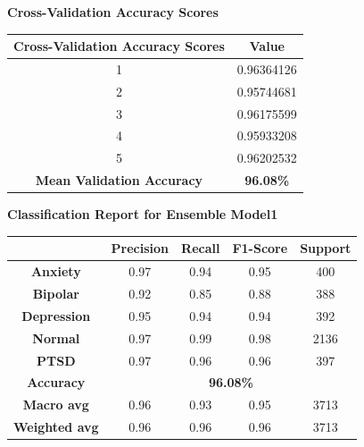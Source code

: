 \begin{center}
    \textbf{Cross-Validation Accuracy Scores} \\[0.5em]
    \begin{tabular}{|c|c|}
        \hline
        \textbf{Cross-Validation Accuracy Scores} & \textbf{Value} \\ \hline
        1 & 0.96364126 \\ \hline
        2 & 0.95744681 \\ \hline
        3 & 0.96175599 \\ \hline
        4 & 0.95933208 \\ \hline
        5 & 0.96202532 \\ \hline
        \textbf{Mean Validation Accuracy} & \textbf{96.08\%} \\ \hline
    \end{tabular}
\end{center}


\begin{center}
    \textbf{Classification Report for Ensemble Model1} \\[0.5em]
    \begin{tabular}{|c|c|c|c|c|}
        \hline
        & \textbf{Precision} & \textbf{Recall} & \textbf{F1-Score} & \textbf{Support} \\ \hline
        \textbf{Anxiety}    & 0.97 & 0.94 & 0.95 & 400  \\ \hline
        \textbf{Bipolar}    & 0.92 & 0.85 & 0.88 & 388  \\ \hline
        \textbf{Depression} & 0.95 & 0.94 & 0.94 & 392  \\ \hline
        \textbf{Normal}     & 0.97 & 0.99 & 0.98 & 2136 \\ \hline
        \textbf{PTSD}       & 0.97 & 0.96 & 0.96 & 397  \\ \hline
        \textbf{Accuracy}   & \multicolumn{4}{|c|}{\textbf{96.08\%}} \\ \hline
        \textbf{Macro avg}  & 0.96 & 0.93 & 0.95 & 3713 \\ \hline
        \textbf{Weighted avg} & 0.96 & 0.96 & 0.96 & 3713 \\ \hline
    \end{tabular}
\end{center}

